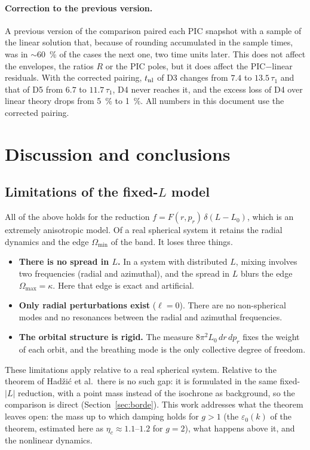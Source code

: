 \documentclass[11pt,a4paper]{article}
\begin{document}
\paragraph{Correction to the previous version.} A previous version of the comparison paired each PIC snapshot with a sample of the
linear solution that, because of rounding accumulated in the sample times, was in
$\sim$\SI{60}{\%} of the cases the next one, two time units later. This does not affect the
envelopes, the ratios $R$ or the PIC poles, but it does affect the PIC$-$linear residuals.
With the corrected pairing, $t_{\rm nl}$ of D3 changes from $7.4$ to $13.5\,\tau_1$ and that
of D5 from $6.7$ to $11.7\,\tau_1$, D4 never reaches it, and the excess loss of D4 over
linear theory drops from \SI{5}{\%} to \SI{1}{\%}. All numbers in this document use the
corrected pairing.

\section{Discussion and conclusions}
\label{sec:conclusiones}

\subsection{Limitations of the fixed-\texorpdfstring{$L$}{L} model}
\label{sec:limites}

All of the above holds for the reduction $f=F(r,p_r)\,\delta(L-L_0)$, which is an extremely
anisotropic model. Of a real spherical system it retains the radial dynamics and the edge
$\Omega_{\min}$ of the band. It loses three things.
\begin{itemize}
\item \textbf{There is no spread in $L$.} In a system with distributed $L$, mixing involves
two frequencies (radial and azimuthal), and the spread in $L$ blurs the edge
$\Omega_{\max}=\kappa$. Here that edge is exact and artificial.
\item \textbf{Only radial perturbations exist} ($\ell=0$). There are no non-spherical modes
and no resonances between the radial and azimuthal frequencies.
\item \textbf{The orbital structure is rigid.} The measure $8\pi^2L_0\,dr\,dp_r$ fixes the
weight of each orbit, and the breathing mode is the only collective degree of freedom.
\end{itemize}
These limitations apply relative to a real spherical system. Relative to the theorem of
Hadžić et al.\ there is no such gap: it is formulated in the same fixed-$|L|$ reduction,
with a point mass instead of the isochrone as background, so the comparison is direct
(Section~\ref{sec:borde}). This work addresses what the theorem leaves open: the mass up
to which damping holds for $g>1$ (the $\varepsilon_0(k)$ of the theorem, estimated here as
$\eta_c\approx1.1$--$1.2$ for $g=2$), what happens above it, and the nonlinear dynamics.
\end{document}
